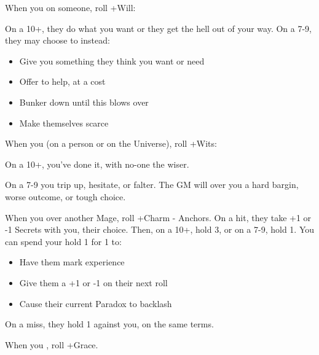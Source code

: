 


\begin{multicols}{3}

  \begin{move}
    When you  on someone, roll +Will:

    On a 10+, they do what you want or they get the hell out of your
    way. On a 7-9, they may choose to instead:
    \begin{itemize}
      \setlength\itemsep{0em}
    \item Give you something they think you want or need
    \item Offer to help, at a cost
    \item Bunker down until this blows over
    \item Make themselves scarce
    \end{itemize}
  \end{move}

  \SEPARATOR
  
  \begin{move}
    When you  (on a person or on the Universe),
    roll +Wits:

    On a 10+, you've done it, with no-one the wiser.

    On a 7-9 you trip up, hesitate, or falter. The GM will over you a
    hard bargin, worse outcome, or tough choice.
  \end{move}

  \SEPARATOR

  \begin{move}
    When you  over
    another Mage, roll +Charm - Anchors. On a hit, they take +1 or -1
    Secrets with you, their choice. Then, on a 10+, hold 3, or on a
    7-9, hold 1. You can spend your hold 1 for 1 to:
    \begin{itemize}
      \setlength\itemsep{0em}
    \item Have them mark experience
    \item Give them a +1 or -1 on their next roll
    \item Cause their current Paradox to backlash
    \end{itemize}
    On a miss, they hold 1 against you, on the same terms.
  \end{move}

  \columnbreak
  
  \begin{move}
    When you , roll +Grace.


\end{move}
\end{multicols}
